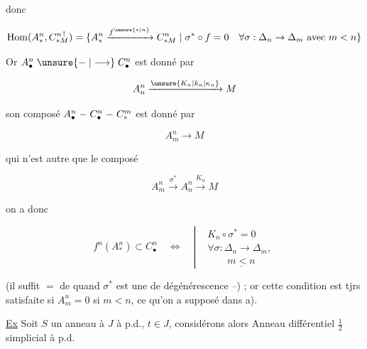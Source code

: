 
donc

\[
\operatorname{Hom}(A^n_*,C^{n\,!}_{*M})=
\{A^n_*\xrightarrow{f^{\unsure{*|n}}}C^n_{*M}\mid \sigma^*\circ f=0\quad\forall\sigma:\Delta_n\to\Delta_m\text{ avec }m<n\}
\]


Or  $A^n_\bullet\mathrel{\unsure{\relbar|\longrightarrow}}C^n_\bullet$ est donné par

\[
A^n_n\xrightarrow{\unsure{K_n|k_n|\kappa_n}}M
\]

son composé $A^n_\bullet\relbar C^n_\bullet\relbar C^m_*$ est donné par 

\[
A^n_m\longrightarrow M
\]

qui n'est autre que le composé

\[
A^n_m\xrightarrow{\sigma^*}A^n_n\xrightarrow{K_n}M
\]

 on a donc

\[
f^n(A^n_*)\subset C^n_\bullet\quad\Longleftrightarrow\quad
\left|\begin{aligned}
&K_n\circ\sigma^*=0\\
&\forall\sigma:\Delta_n\longrightarrow\Delta_m,\\[-2pt]
&\hspace{2em}\underline{m<n}
\end{aligned}\right.
\]

(il suffit $=$ de  quand $\sigma^*$ est une  de dégénérescence --) ; or cette condition est tjrs satisfaite si $A_m^n=0$ si $m<n$, ce qu'on a supposé dans a).

\uline{Ex} Soit $S$ un anneau à  $J$ à p.d., $t\in J$, considérons alors  Anneau différentiel $\frac{1}{2}$ simplicial à p.d.

